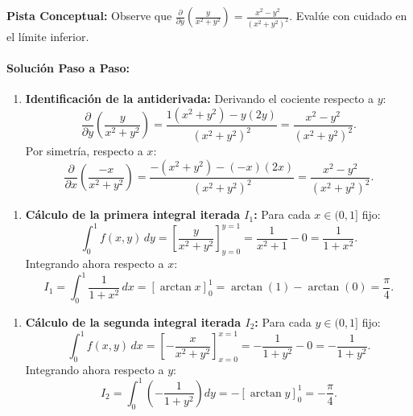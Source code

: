 \documentclass[11pt,a4paper]{article}
\begin{document}
\begin{tcolorbox}[colback=yellow!4,colframe=accentamber!70,arc=1mm,boxrule=0.5pt,left=3mm,right=3mm,top=1.5mm,bottom=1.5mm]
\textbf{Pista Conceptual:} Observe que $\frac{\partial}{\partial y}\left(\frac{y}{x^2+y^2}\right) = \frac{x^2 - y^2}{(x^2+y^2)^2}$. Evalúe con cuidado en el límite inferior.
\end{tcolorbox}

\paragraph{Solución Paso a Paso:}\par
\begin{enumerate}[label=\textbf{\arabic*.}]
\item \textbf{Identificación de la antiderivada:}
Derivando el cociente respecto a $y$:
\begin{equation*}
\frac{\partial}{\partial y} \left( \frac{y}{x^2 + y^2} \right) = \frac{1(x^2 + y^2) - y(2y)}{(x^2 + y^2)^2} = \frac{x^2 - y^2}{(x^2 + y^2)^2}.
\end{equation*}
Por simetría, respecto a $x$:
\begin{equation*}
\frac{\partial}{\partial x} \left( \frac{-x}{x^2 + y^2} \right) = \frac{-(x^2 + y^2) - (-x)(2x)}{(x^2 + y^2)^2} = \frac{x^2 - y^2}{(x^2 + y^2)^2}.
\end{equation*}
\end{enumerate}

\begin{enumerate}[label=\textbf{\arabic*.}]
\item \textbf{Cálculo de la primera integral iterada $I_1$:}
Para cada $x \in (0, 1]$ fijo:
\begin{equation*}
\int_0^1 f(x,y) \, dy = \left[ \frac{y}{x^2 + y^2} \right]_{y=0}^{y=1} = \frac{1}{x^2 + 1} - 0 = \frac{1}{1 + x^2}.
\end{equation*}
Integrando ahora respecto a $x$:
\begin{equation*}
I_1 = \int_0^1 \frac{1}{1 + x^2} \, dx = [\arctan x]_0^1 = \arctan(1) - \arctan(0) = \frac{\pi}{4}.
\end{equation*}
\end{enumerate}

\begin{enumerate}[label=\textbf{\arabic*.}]
\item \textbf{Cálculo de la segunda integral iterada $I_2$:}
Para cada $y \in (0, 1]$ fijo:
\begin{equation*}
\int_0^1 f(x,y) \, dx = \left[ -\frac{x}{x^2 + y^2} \right]_{x=0}^{x=1} = -\frac{1}{1 + y^2} - 0 = -\frac{1}{1 + y^2}.
\end{equation*}
Integrando ahora respecto a $y$:
\begin{equation*}
I_2 = \int_0^1 \left( -\frac{1}{1 + y^2} \right) dy = -[\arctan y]_0^1 = -\frac{\pi}{4}.
\end{equation*}
\end{enumerate}
\end{document}
